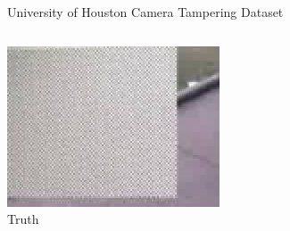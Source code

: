 \documentclass[10pt]{beamer}
\begin{document}
\begin{frame}{University of Houston Camera Tampering Dataset}
\begin{columns}
{            \includegraphics[width = \textwidth]{figures/rsvd_uhctd/true_frame75.jpg}\\
            {\centering Truth}
        }
\end{columns}
\end{frame}
\end{document}
